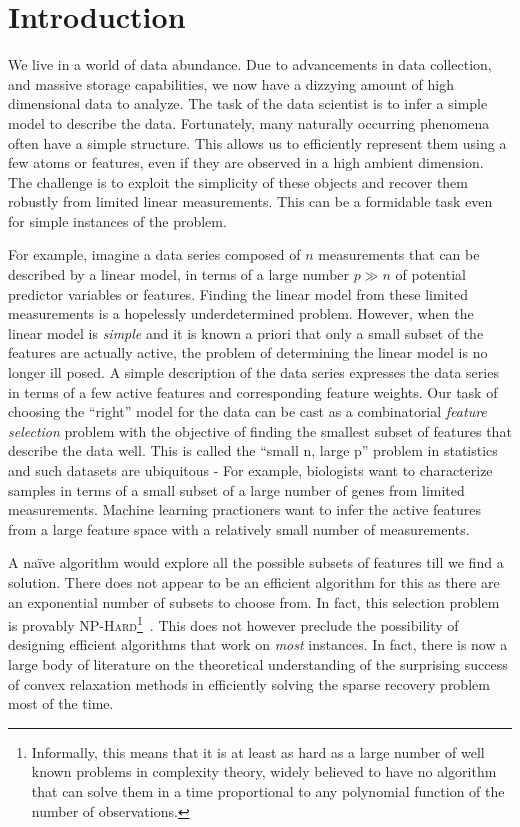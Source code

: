\chapter{Introduction}

We live in a world of data abundance. Due to advancements in data collection,
and massive storage capabilities, we now have a dizzying amount of high
dimensional data to analyze. The task of the data scientist is to infer a simple
model to describe the data. Fortunately, many naturally occurring phenomena
often have a simple structure. This allows us to efficiently represent them
using a few atoms or features, even if they are observed in a high ambient
dimension. The challenge is to exploit the simplicity of these objects and
recover them robustly from limited linear measurements. This can be a formidable
task even for simple instances of the problem.

For example, imagine a data series composed of $n$ measurements that can be
described by a linear model, in terms of a large number $p \gg n$ of potential
predictor variables or features. Finding the linear model from these limited
measurements is a hopelessly underdetermined problem. However, when the linear
model is \emph{simple} and it is known a priori that only a small subset of the
features are actually active, the problem of determining the linear model is no
longer ill posed. A simple description of the data series expresses the data
series in terms of a few active features and corresponding feature weights. Our
task of choosing the ``right'' model for the data can be cast as a combinatorial
\emph{feature selection} problem with the objective of finding the smallest
subset of features that describe the data well. This is called the ``small n,
large p'' problem in statistics and such datasets are ubiquitous - For example,
biologists want to characterize samples in terms of a small subset of a large
number of genes from limited measurements. Machine learning practioners want to
infer the active features from a large feature space with a relatively small
number of measurements.

A naïve algorithm would explore all the possible subsets of features till we
find a solution. There does not appear to be an efficient algorithm for this as
there are an exponential number of subsets to choose from. In fact, this
selection problem is provably \textsc{NP-Hard}\footnote{Informally, this means
that it is at least as hard as a large number of well known problems in
complexity theory, widely believed to have no algorithm that can solve them in a
time proportional to any polynomial function of the number of
observations.}~\cite{Natarajan95}. This does not however preclude the
possibility of designing efficient algorithms that work on \emph{most}
instances. In fact, there is now a large body of literature on the theoretical
understanding of the surprising success of convex relaxation methods in
efficiently solving the sparse recovery problem most of the time.


